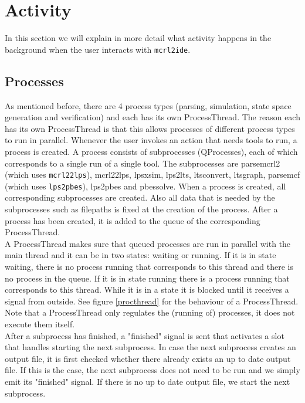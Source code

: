 \documentclass[a4paper, fleqn]{article}
\begin{document}
\section{Activity}
In this section we will explain in more detail what activity happens in the background when the user interacts with \texttt{mcrl2ide}.

\subsection{Processes}
\label{secprocesses}
As mentioned before, there are 4 process types (parsing, simulation, state space generation and verification) and each has its own ProcessThread. The reason each has its own ProcessThread is that this allows processes of different process types to run in parallel. Whenever the user invokes an action that needs tools to run, a process is created. A process consists of subprocesses (QProcesses), each of which corresponds to a single run of a single tool. The subprocesses are parsemcrl2 (which uses \texttt{mcrl22lps}), mcrl22lps, lpsxsim, lps2lts, ltsconvert, ltsgraph, parsemcf (which uses \texttt{lps2pbes}), lps2pbes and pbessolve. When a process is created, all corresponding subprocesses are created. Also all data that is needed by the subprocesses such as filepaths is fixed at the creation of the process. After a process has been created, it is added to the queue of the corresponding ProcessThread.\\
A ProcessThread makes sure that queued processes are run in parallel with the main thread and it can be in two states: waiting or running. If it is in state waiting, there is no process running that corresponds to this thread and there is no process in the queue. If it is in state running there is a process running that corresponds to this thread. While it is in a state it is blocked until it receives a signal from outside. See figure \ref{procthread} for the behaviour of a ProcessThread. Note that a ProcessThread only regulates the (running of) processes, it does not execute them itself.\\
After a subprocess has finished, a "finished" signal is sent that activates a slot that handles starting the next subprocess. In case the next subprocess creates an output file, it is first checked whether there already exists an up to date output file. If this is the case, the next subprocess does not need to be run and we simply emit its "finished" signal. If there is no up to date output file, we start the next subprocess.\\
\end{document}
